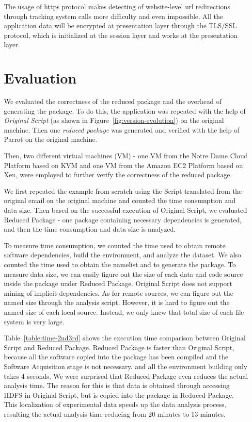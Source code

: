 \documentclass[procedia]{easychair}
\begin{document}
The usage of https protocol makes detecting of website-level url redirections through tracking system calls more difficulty and even impossible. All the application data will be encrypted at presentation layer through the TLS/SSL protocol, which is initialized at the session layer and works at the presentation layer.

\section{Evaluation}

We evaluated the correctness of the reduced package and the overhead of generating the package.
To do this, the application was repeated with the help of \emph{Original Script} (as shown in Figure~\ref{fig:version-evolution}) on the original machine. 
Then one \emph{reduced package} was generated and verified with the help of Parrot on the original machine.

Then, two different virtual machines (VM) - one VM from the Notre Dame Cloud Platform based on KVM and one VM from the Amazon EC2 Platform based on Xen, were employed to further verify the correctness of the reduced package.

We first repeated the example from scratch using the Script translated from the original email on the original machine and counted the time consumption and data size. 
Then based on the successful execution of Original Script, we evaluated Reduced Package - one package containing necessary dependencies is generated, and then the time consumption and data size is analyzed. 

To measure time consumption, we counted the time used to obtain remote software dependencies, build the environment, and analyze the dataset. We also counted the time used to obtain the namelist and to generate the package. To measure data size, we can easily figure out the size of each data and code source inside the package under Reduced Package.
Original Script does not support mining of implicit dependencies. As for remote sources, we can figure out the named size through the analysis script. However, it is hard to figure out the named size of each local source. 
Instead, we only knew that total size of each file system is very large.

Table~\ref{table:time-2nd3rd} shows the execution time comparison between
Original Script and Reduced Package.
Reduced Package is faster than Original Script, because all the software copied into the package has been compiled and the Software Acquisition stage is not necessary.
and all the environment building only takes 4 seconds,
We were surprised that Reduced Package even reduces the actual analysis time. 
The reason for this is that data is obtained through accessing HDFS in Original Script, but is copied into the package in Reduced Package. This localization of experimental data speeds up the data analysis process, resulting the actual analysis time reducing from 20 minutes to 13 minutes.
\end{document}
